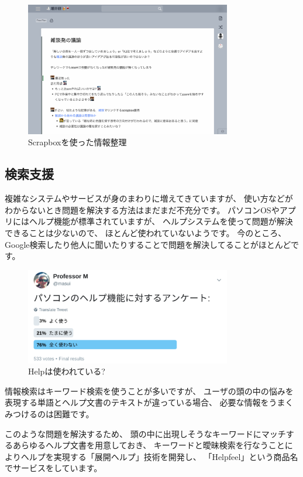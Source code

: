 \documentclass[topics]{compsoft} %
\begin{document}
\begin{figure}[t]
  \includegraphics[width=9cm,bb=0 0 2235 1452]{figures/cca2e0eaed298ea4952a26d2effa238c.png}
  \caption{Scrapboxを使った情報整理}
  \label{example1}
\end{figure}


\subsection{検索支援}

複雑なシステムやサービスが身のまわりに増えてきていますが、
使い方などがわからないとき問題を解決する方法はまだまだ不充分です。
パソコンOSやアプリにはヘルプ機能が標準されていますが、
ヘルプシステムを使って問題が解決できることは少ないので、
ほとんど使われていないようです。
今のところ、Google検索したり他人に聞いたりすることで問題を解決してることがほとんどです。

\begin{figure}[t]
  \includegraphics[width=9cm,bb=0 0 1332 623]{figures/383ee54c265ebbb88778d7ea0fbea5b1.png}
  \caption{Helpは使われている?}
  \label{example1}
\end{figure}


情報検索はキーワード検索を使うことが多いですが、
ユーザの頭の中の悩みを表現する単語とヘルプ文書のテキストが違っている場合、
必要な情報をうまくみつけるのは困難です。

このような問題を解決するため、
頭の中に出現しそうなキーワードにマッチするあらゆるヘルプ文書を用意しておき、
キーワードと曖昧検索を行なうことによりヘルプを実現する「展開ヘルプ」\cite{xxx}技術を開発し、
「Helpfeel」という商品名でサービスをしています。
\end{document}
